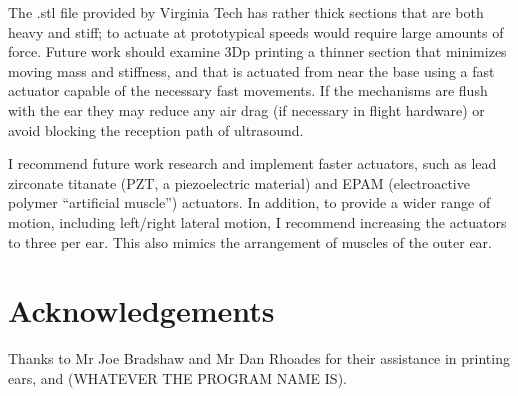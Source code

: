 \documentclass{article}
\begin{document}
The .stl file provided by Virginia Tech has rather thick sections that are both heavy and stiff; to actuate at prototypical speeds would require large amounts of force.  Future work should examine 3Dp printing a thinner section that minimizes moving mass and stiffness, and that is actuated from near the base using a fast actuator capable of the necessary fast movements. If the mechanisms are flush with the ear they may reduce any air drag (if necessary in flight hardware) or avoid blocking the reception path of ultrasound. 

I recommend future work research and implement faster actuators, such as lead zirconate titanate (PZT, a piezoelectric material) and EPAM (electroactive polymer ``artificial muscle'') actuators. In addition, to provide a wider range of motion, including left/right lateral motion, I recommend increasing the actuators to three per ear. This also mimics the arrangement of muscles of the outer ear. 

\section*{Acknowledgements}
Thanks to Mr Joe Bradshaw and Mr Dan Rhoades for their assistance in printing ears, and (WHATEVER THE PROGRAM NAME IS). 


\end{document}
